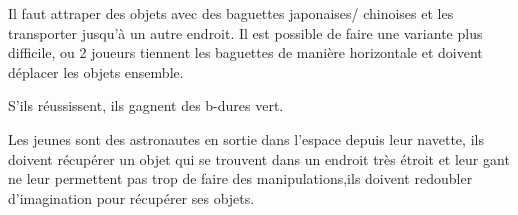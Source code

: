 \documentclass{grand-jeu}
\begin{document}
\begin{liste-materiel}
\end{liste-materiel}

\begin{regles}
Il faut attraper des objets avec des baguettes japonaises/ chinoises et les transporter jusqu’à un autre endroit. Il est possible de faire une variante plus difficile, ou 2 joueurs tiennent les baguettes de manière horizontale et doivent déplacer les objets ensemble.

S’ils réussissent, ils gagnent des b-dures vert.
\end{regles}

\begin{imaginaire}
Les jeunes sont des astronautes en sortie dans l’espace depuis leur navette, ils doivent récupérer un objet qui se trouvent dans un endroit très étroit et leur gant ne leur permettent pas trop de faire des manipulations,ils doivent redoubler d'imagination pour récupérer ses objets.


\end{imaginaire}

\begin{moments-stop}
\end{moments-stop}
\end{document}
